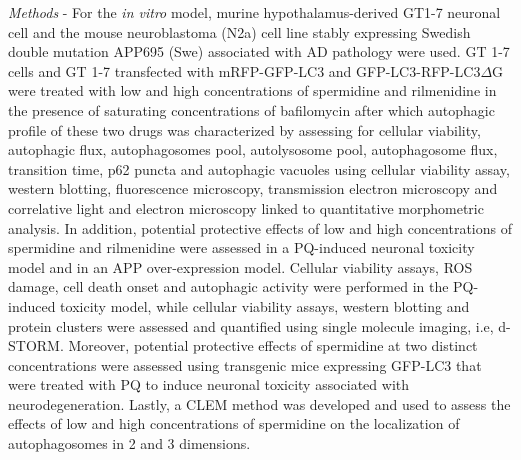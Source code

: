\textit{Methods} - For the \textit{in vitro} model, murine hypothalamus-derived GT1-7 neuronal cell and the mouse neuroblastoma (N2a) cell line stably expressing Swedish  double mutation APP695 (Swe) associated with AD pathology were used. GT 1-7 cells and GT 1-7 transfected with mRFP-GFP-LC3 and GFP-LC3-RFP-LC3$\Delta$G were treated with low and high concentrations of spermidine and rilmenidine in the presence of saturating concentrations of bafilomycin after which autophagic profile of these two drugs was characterized by assessing for cellular viability, autophagic flux, autophagosomes pool, autolysosome pool, autophagosome flux, transition time, p62 puncta and autophagic vacuoles using cellular viability assay, western blotting, fluorescence microscopy, transmission electron microscopy and correlative light and electron microscopy linked to quantitative morphometric analysis. In addition, potential protective effects of low and high concentrations of  spermidine and rilmenidine were assessed in a PQ-induced neuronal toxicity model and in an APP over-expression model. Cellular viability assays, ROS damage, cell death onset and autophagic activity were performed in the PQ-induced toxicity model, while cellular viability assays, western blotting and protein clusters were assessed and quantified using single molecule imaging, i.e, d-STORM. Moreover, potential protective effects of spermidine at two distinct concentrations were assessed using transgenic mice expressing GFP-LC3 that were treated with PQ to induce neuronal toxicity associated with neurodegeneration. Lastly, a CLEM method was developed and used to assess the effects of low and high concentrations of spermidine on the localization of autophagosomes in 2 and 3 dimensions. 

